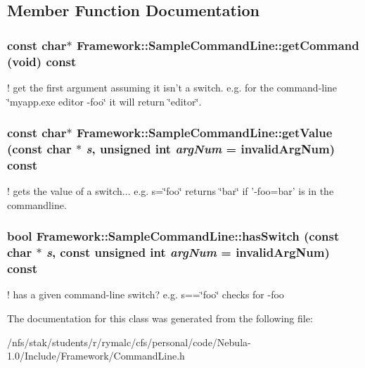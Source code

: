 \subsection{Member Function Documentation}
\hypertarget{classFramework_1_1SampleCommandLine_a13ab8af52edd8fa4c7e52c2fd90aa0d8}{
\subsubsection[{getCommand}]{\setlength{\rightskip}{0pt plus 5cm}const char$\ast$ Framework::SampleCommandLine::getCommand (void) const}}
\label{classFramework_1_1SampleCommandLine_a13ab8af52edd8fa4c7e52c2fd90aa0d8}
! get the first argument assuming it isn't a switch. e.g. for the command-\/line \char`\"{}myapp.exe editor -\/foo\char`\"{} it will return \char`\"{}editor\char`\"{}. \hypertarget{classFramework_1_1SampleCommandLine_ae594ca031cedf3693eef6ba3ca1c5f04}{
\subsubsection[{getValue}]{\setlength{\rightskip}{0pt plus 5cm}const char$\ast$ Framework::SampleCommandLine::getValue (const char $\ast$ {\em s}, \/  unsigned int {\em argNum} = {\ttfamily invalidArgNum}) const}}
\label{classFramework_1_1SampleCommandLine_ae594ca031cedf3693eef6ba3ca1c5f04}
! gets the value of a switch... e.g. s=\char`\"{}foo\char`\"{} returns \char`\"{}bar\char`\"{} if '-\/foo=bar' is in the commandline. \hypertarget{classFramework_1_1SampleCommandLine_ae49e4180a596d53ef291243ee9c77aed}{
\subsubsection[{hasSwitch}]{\setlength{\rightskip}{0pt plus 5cm}bool Framework::SampleCommandLine::hasSwitch (const char $\ast$ {\em s}, \/  const unsigned int {\em argNum} = {\ttfamily invalidArgNum}) const}}
\label{classFramework_1_1SampleCommandLine_ae49e4180a596d53ef291243ee9c77aed}
! has a given command-\/line switch? e.g. s==\char`\"{}foo\char`\"{} checks for -\/foo 

The documentation for this class was generated from the following file:\begin{DoxyCompactItemize}
\item 
/nfs/stak/students/r/rymalc/cfs/personal/code/Nebula-\/1.0/Include/Framework/CommandLine.h\end{DoxyCompactItemize}
